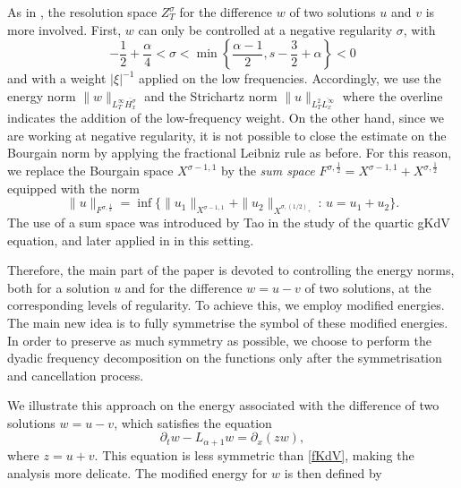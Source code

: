 \documentclass{amsart}
\theoremstyle{definition}
\theoremstyle{remark}
\numberwithin{equation}{section}
\begin{document}
As in \cite{MPV}, the resolution space $Z^{\sigma}_T$ for the difference $w$ of two solutions $u$ and $v$ is more involved. First, $w$ can only be controlled at a negative regularity $\sigma$, with  
\[-\frac 1 2 +\frac \alpha 4< \sigma<\min \left\{\frac{\alpha-1}2,s-\frac 32+ \alpha\right\}<0\] and with a weight $|\xi|^{-1}$ applied on the low frequencies. Accordingly, we use the energy norm $\|w\|_{L^{\infty}_T\overline{H^\sigma_x}}$ and the Strichartz norm $\|u\|_{L^2_T\overline{L^{\infty}_x}}$ where the overline indicates the addition of the low-frequency weight. On the other hand, since we are working at negative regularity, it is not possible to close the estimate on the Bourgain norm by applying the fractional Leibniz rule as before. For this reason, we replace the Bourgain space $X^{\sigma-1,1}$  by the \emph{sum space}  $F^{\sigma,\frac12}=X^{\sigma-1,1}+X^{\sigma,\frac12}$
 equipped with  the norm
 \[\|u\|_{F^{\sigma,\frac12}} = \inf \big\{ \|u_1\|_{X^{\sigma-1,1}} + \|u_2\|_{X^{\sigma,(1/2)_+}} \, : \, u=u_1+u_2\big\}. \]
The use of a sum space was introduced by Tao \cite{Tao07} in the study of the quartic gKdV equation, and later applied in \cite{MV, MPV} in this setting.

Therefore, the main part of the paper is devoted to controlling the energy norms, both for a solution $u$ and for the difference $w=u-v$ of two solutions, at the corresponding levels of regularity. To achieve this, we employ modified energies. The main new idea is to fully symmetrise the symbol of these modified energies. In order to preserve as much symmetry as possible, we choose to perform the dyadic frequency decomposition on the functions only after the symmetrisation and cancellation process. 

We illustrate this approach on the energy associated with the difference of two solutions $w=u-v$, which satisfies the equation
\begin{equation} \label{fKdV:diff}
\partial_tw-L_{\alpha+1}w = \partial_x(zw) ,
\end{equation} 
where $z=u+v$. This equation is less symmetric than \eqref{fKdV}, making the analysis more delicate. The modified energy for $w$ is then defined by 
\end{document}
